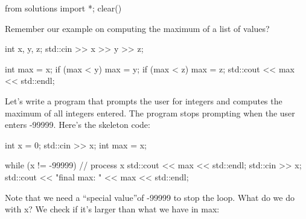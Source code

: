 \begin{python0}
from solutions import *; clear()
\end{python0}

Remember our example on computing the maximum of a list of values?
\begin{console}
int x, y, z;
std::cin >> x >> y >> z;

int max = x;
if (max < y) max = y;
if (max < z) max = z;
std::cout << max << std::endl;
\end{console}

Let's write a program that prompts the user for integers
and computes the maximum of all integers entered. The program stops
prompting when the user enters -99999. Here's the
skeleton code:
\begin{console}[commandchars=\~\@\$]
int x = 0;
std::cin >> x;
int max = x;

while (x != -99999)
{     
      // process x
      std::cout << max << std::endl;
      std::cin >> x;
}
std::cout << "final max: " << max
          << std::endl;
\end{console}

Note that we need a ``special value''of -99999 to stop the loop. What
do we do with x? We check if it's larger than what we
have in max:


